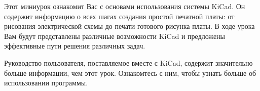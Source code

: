 

Этот миниурок ознакомит Вас с основами использования системы KiCad. Он содержит
информацию о всех шагах создания простой печатной платы: от рисования
электрической схемы до печати готового рисунка платы. В ходе урока Вам будут
представлены различные возможности KiCad и предложены эффективные пути решения
различных задач.

Руководство пользователя, поставляемое вместе с KiCad, содержит значительно
больше информации, чем этот урок. Ознакомтесь с ним, чтобы узнать больше об
использовании программы.



